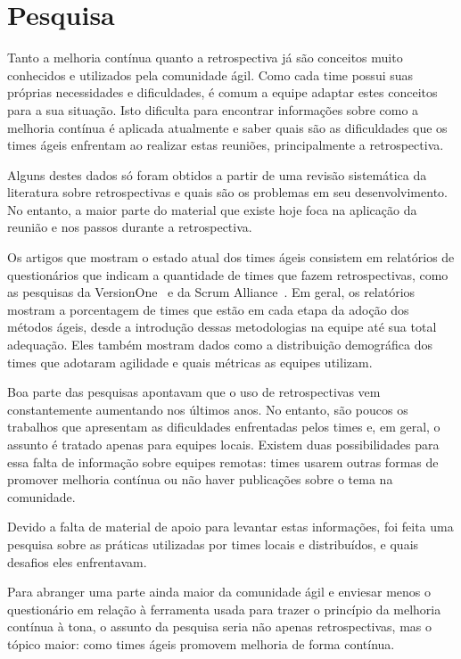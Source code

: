 \section{Pesquisa}

Tanto a melhoria contínua quanto a retrospectiva já são conceitos muito conhecidos e utilizados pela comunidade ágil. Como cada time possui suas próprias necessidades e dificuldades, é comum a equipe adaptar estes conceitos para a sua situação. Isto dificulta para encontrar informações sobre como a melhoria contínua é aplicada atualmente e saber quais são as dificuldades que os times ágeis enfrentam ao realizar estas reuniões, principalmente a retrospectiva. 

Alguns destes dados só foram obtidos a partir de uma revisão sistemática da literatura sobre retrospectivas e quais são os problemas em seu desenvolvimento. No entanto, a maior parte do material que existe hoje foca na aplicação da reunião e nos passos durante a retrospectiva.

Os artigos que mostram o estado atual dos times ágeis consistem em relatórios de questionários que indicam a quantidade de times que fazem retrospectivas, como as pesquisas da VersionOne~\cite{versionOne} e da Scrum Alliance~\cite{scrumAlliance}. Em geral, os relatórios mostram a porcentagem de times que estão em cada etapa da adoção dos métodos ágeis, desde a introdução dessas metodologias na equipe até sua total adequação. Eles também mostram dados como a distribuição demográfica dos times que adotaram agilidade e quais métricas as equipes utilizam.

Boa parte das pesquisas apontavam que o uso de retrospectivas vem constantemente aumentando nos últimos anos. No entanto, são poucos os trabalhos que apresentam as dificuldades enfrentadas pelos times e, em geral, o assunto é tratado apenas para equipes locais. Existem duas possibilidades para essa falta de informação sobre equipes remotas: times usarem outras formas de promover melhoria contínua ou não haver publicações sobre o tema na comunidade.

Devido a falta de material de apoio para levantar estas informações, foi feita uma pesquisa sobre as práticas utilizadas por times locais e distribuídos, e quais desafios eles enfrentavam.

Para abranger uma parte ainda maior da comunidade ágil e enviesar menos o questionário em relação à ferramenta usada para trazer o princípio da melhoria contínua à tona, o assunto da pesquisa seria não apenas retrospectivas, mas o tópico maior: como times ágeis promovem melhoria de forma contínua.

